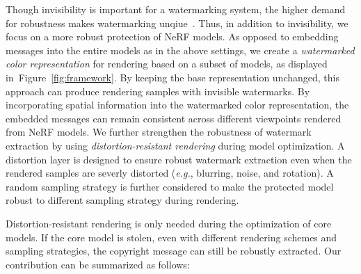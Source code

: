 \documentclass[10pt,twocolumn,letterpaper]{article}
\def\eg{{\emph{e.g.}}}
\newcommand{\Fref}[1]{Figure~\ref{#1}}
\def\eg{\emph{e.g.}}
\def\eg{{\emph{e.g.}}}
\newcommand{\renjie}[1]{\textcolor{red}{{#1}}}
\begin{document}


 
Though invisibility is important for a watermarking system, the higher demand for robustness makes watermarking unqiue~\cite{zhu2018hidden}. Thus, in addition to invisibility, we focus on a more robust protection of NeRF models. As opposed to embedding messages into the entire models as in the above settings, we create a \textit{watermarked color representation} for rendering based on a subset of models, as displayed in~\Fref{fig:framework}. By keeping the base representation unchanged, this approach can produce rendering samples with invisible watermarks. By incorporating spatial information into the watermarked color representation, the embedded messages can remain consistent across different viewpoints rendered from NeRF models. We further strengthen the robustness of watermark extraction by using \textit{distortion-resistant rendering} during model optimization. A distortion layer is designed to ensure robust watermark extraction even when the rendered samples are severly distorted (\eg, blurring, noise, and rotation). A random sampling strategy is further considered to make the protected model robust to different sampling strategy during rendering. 

Distortion-resistant rendering is only needed during the optimization of core models. If the core model is stolen, even with different rendering schemes and sampling strategies, the copyright message can still be robustly extracted. Our contribution can be summarized as follows:
\end{document}

